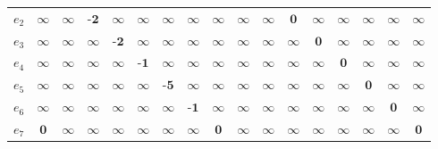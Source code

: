 \documentclass{article}
\theoremstyle{definition}
\begin{document}
\begin{tabular}{c | cccccccccccccccc}
$e_2$	&$\infty$	&$\infty$	&$\textbf{-2}$	&$\infty$	&$\infty$	&$\infty$	&$\infty$	&$\infty$	&$\infty$	&$\infty$	&$\textbf{0}$	&$\infty$	&$\infty$	&$\infty$	&$\infty$	&$\infty$\\
$e_3$	&$\infty$	&$\infty$	&$\infty$	&$\textbf{-2}$	&$\infty$	&$\infty$	&$\infty$	&$\infty$	&$\infty$	&$\infty$	&$\infty$	&$\textbf{0}$	&$\infty$	&$\infty$	&$\infty$	&$\infty$\\
$e_4$	&$\infty$	&$\infty$	&$\infty$	&$\infty$	&$\textbf{-1}$	&$\infty$	&$\infty$	&$\infty$	&$\infty$	&$\infty$	&$\infty$	&$\infty$	&$\textbf{0}$	&$\infty$	&$\infty$	&$\infty$\\
$e_5$	&$\infty$	&$\infty$	&$\infty$	&$\infty$	&$\infty$	&$\textbf{-5}$	&$\infty$	&$\infty$	&$\infty$	&$\infty$	&$\infty$	&$\infty$	&$\infty$	&$\textbf{0}$	&$\infty$	&$\infty$\\
$e_6$	&$\infty$	&$\infty$	&$\infty$	&$\infty$	&$\infty$	&$\infty$	&$\textbf{-1}$	&$\infty$	&$\infty$	&$\infty$	&$\infty$	&$\infty$	&$\infty$	&$\infty$	&$\textbf{0}$	&$\infty$\\
$e_7$	&$\textbf{0}$	&$\infty$	&$\infty$	&$\infty$	&$\infty$	&$\infty$	&$\infty$	&$\textbf{0}$	&$\infty$	&$\infty$	&$\infty$	&$\infty$	&$\infty$	&$\infty$	&$\infty$	&$\textbf{0}$\\
\end{tabular}
\end{document}
